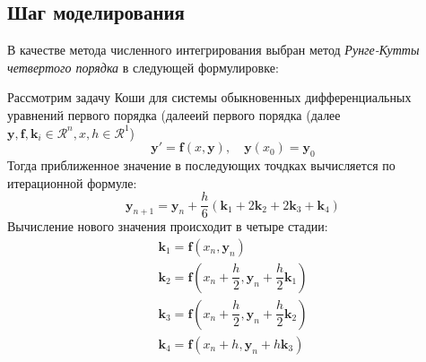 \documentclass{article}%
\numberwithin{equation}{subsection}
\let\oldsubsection\subsection%
\renewcommand{\subsection}{%
  \renewcommand{\theequation}{\thesubsection.\arabic{equation}}%
  \oldsubsection}%
\begin{document}
\subsection{Шаг моделирования}
В качестве метода численного интегрирования выбран метод {\it Рунге-Кутты четвертого порядка} в следующей формулировке:
\newline\par
Рассмотрим задачу Коши для системы обыкновенных дифференциальных уравнений первого порядка (далееий первого порядка (далее $\mathbf{y}, \mathbf{f}, \mathbf{k}_i \in \mathcal{R}^n, x, h \in \mathcal{R}^1$)
\begin{equation}
    \mathbf{y}'=\mathbf{f}(x, \mathbf{y}), \quad \mathbf{y}(x_0)=\mathbf{y}_0
\end{equation}
Тогда приближенное значение в последующих точдках вычисляется по итерационной формуле:
\begin{equation}
    \mathbf{y}_{n+1}=\mathbf{y}_n + \dfrac{h}{6}(\mathbf{k}_1 + 2\mathbf{k}_2 + 2\mathbf{k}_3 + \mathbf{k}_4)
\end{equation}
Вычисление нового значения происходит в четыре стадии:
\begin{equation}
\begin{gathered}
    \mathbf{k}_1 = \mathbf{f}(x_n, \mathbf{y}_n)\\
    \mathbf{k}_2 = \mathbf{f}(x_n + \dfrac{h}{2}, \mathbf{y}_n + \dfrac{h}{2}\mathbf{k}_1)\\
    \mathbf{k}_3 = \mathbf{f}(x_n + \dfrac{h}{2}, \mathbf{y}_n + \dfrac{h}{2}\mathbf{k}_2)\\
    \mathbf{k}_4 = \mathbf{f}(x_n + h, \mathbf{y}_n + h\mathbf{k}_3)
\end{gathered}
\end{equation}
\end{document}
